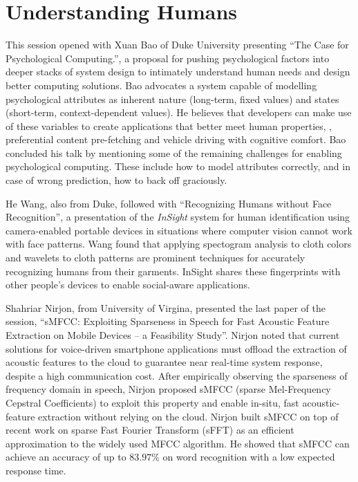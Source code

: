 \section{Understanding Humans}
\label{sec:humans}

This session opened with Xuan Bao of Duke University presenting ``The
Case for Psychological Computing.'', a proposal for pushing
psychological factors into deeper stacks of system design to intimately
understand human needs and design better computing solutions.  Bao
advocates a system capable of modelling psychological attributes as
inherent nature (long-term, fixed values) and states (short-term,
context-dependent values). He believes that developers can make use of
these variables to create applications that better meet human
properties, \eg, preferential content pre-fetching and vehicle driving
with cognitive comfort. Bao concluded his talk by mentioning some of the
remaining challenges for enabling psychological computing. These include
how to model attributes correctly, and in case of wrong prediction, how
to back off graciously.

He Wang, also from Duke, followed with ``Recognizing Humans without Face
Recognition'', a presentation of the \emph{InSight} system for human
identification using camera-enabled portable devices in situations where
computer vision cannot work with face patterns. Wang found that
applying spectogram analysis to cloth colors and wavelets to cloth
patterns are prominent techniques for accurately recognizing humans from
their garments. InSight shares these fingerprints with other people's
devices to enable social-aware applications.

Shahriar Nirjon, from University of Virgina, presented the last paper of
the session, ``sMFCC: Exploiting Sparseness in Speech for Fast Acoustic
Feature Extraction on Mobile Devices -- a Feasibility Study''. Nirjon
noted that current solutions for voice-driven smartphone applications
must offload the extraction of acoustic features to the cloud to
guarantee near real-time system response, despite a high communication
cost. After empirically observing the sparseness of frequency domain in
speech, Nirjon proposed sMFCC (sparse Mel-Frequency Cepstral
Coefficients) to exploit this property and enable in-situ, fast
acoustic-feature extraction without relying on the cloud. Nirjon built
sMFCC on top of recent work on sparse Fast Fourier Transform (sFFT) as
an efficient approximation to the widely used MFCC algorithm. He showed
that sMFCC can achieve an accuracy of up to $83.97\%$ on word
recognition with a low expected response time.

